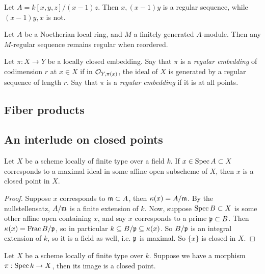 \documentclass[11pt]{amsart}
\begin{document}
\begin{exm}
    Let $A = k[x,y,z]/(x-1)z$. Then $x, (x-1)y$ is a regular sequence, while $(x-1)y,x$ is not.
\end{exm}

\begin{thm}
    Let $A$ be a Noetherian local ring, and $M$ a finitely generated $A$-module. Then any $M$-regular sequence remains regular when reordered.
\end{thm}

\begin{defn}
    Let $\pi:X\to Y$ be a locally closed embedding. Say that $\pi$ is a \emph{regular embedding} of codimension $r$ at $x\in X$ if in $\mathcal{O}_{Y, \pi(x)}$, the ideal of $X$ is generated by a regular sequence of length $r$. Say that $\pi$ is a \emph{regular embedding} if it is at all points.
\end{defn}

\subsection{Fiber products}


\subsection{An interlude on closed points}

\begin{prop}
Let $X$ be a scheme locally of finite type over a field $k$. If $x\in \operatorname{Spec} A \subset X$ corresponds to a maximal ideal in some affine open subscheme of $X$, then $x$ is a closed point in $X$.
\end{prop}

\begin{proof}
Suppose $x$ corresponds to $\mathfrak{m}\subset A$, then $\kappa(x) = A/\mathfrak{m}$. By the nullstellensatz, $A/\mathfrak{m}$ is a finite extension of $k$. Now, suppose $\operatorname{Spec} B\subset X$ is some other affine open containing $x$, and say $x$ corresponds to a prime $\mathfrak{p}\subset B$. Then $\kappa(x) = \operatorname{Frac} B/\mathfrak{p}$, so in particular $k\subseteq B/\mathfrak{p} \subseteq \kappa(x)$. So $B/\mathfrak{p}$ is an integral extension of $k$, so it is a field as well, i.e. $\mathfrak{p}$ is maximal. So $\{x\}$ is closed in $X$.
\end{proof}

\begin{prop}
Let $X$ be a scheme locally of finite type over $k$. Suppose we have a morphism $\pi:\operatorname{Spec} k \to X$, then its image is a closed point.
\end{prop}
\end{document}
